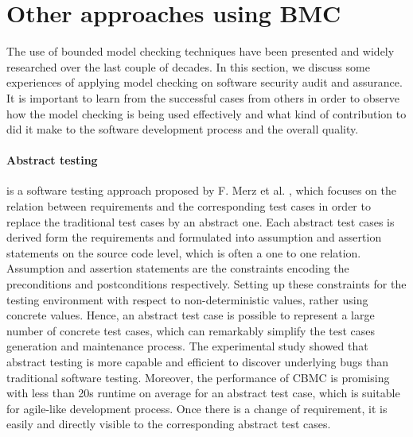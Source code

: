 
\section{Other approaches using BMC}
The use of bounded model checking techniques have been presented and widely researched over the last couple of decades. In this section, we discuss some experiences of applying model checking on software security audit and assurance. It is important to learn from the successful cases from others in order to observe how the model checking is being used effectively and what kind of contribution to did it make to the software development process and the overall quality.





\paragraph{Abstract testing} is a software testing approach proposed by F. Merz et al. \cite{Merz:2015:BGT:2837773.2837824}, which focuses on the relation between requirements and the corresponding test cases in order to replace the traditional test cases by an abstract one. Each abstract test cases is derived form the requirements and formulated into assumption and assertion statements on the source code level, which is often a one to one relation. Assumption and assertion statements are the constraints encoding the preconditions and postconditions respectively. Setting up these constraints for the testing environment with respect to non-deterministic values, rather using concrete values. Hence, an abstract test case is possible to represent a large number of concrete test cases, which can remarkably simplify the test cases generation and maintenance process. The experimental study showed that abstract testing is more capable and efficient to discover underlying bugs than traditional software testing. Moreover, the performance of CBMC is promising with less than 20s runtime on average for an abstract test case, which is suitable for agile-like development process. Once there is a change of requirement, it is easily and directly visible to the corresponding abstract test cases.

